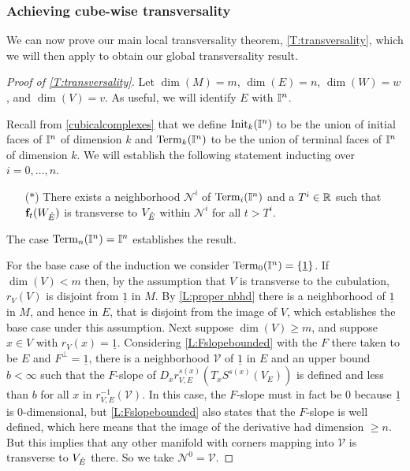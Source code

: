 

\subsubsection{Achieving cube-wise transversality}
We can now prove our main local transversality theorem, \cref{T:transversality}, which we will then apply to obtain our global transversality result.



\begin{proof}[Proof of \cref{T:transversality}]
	Let $\dim(M) = m$, $\dim(E) = n$, $\dim(W) = w$, and $\dim(V) = v$.
	As useful, we will identify $E$ with $\mathbb{I}^n$.

	Recall from \cref{cubicalcomplexes} that we define ${\rm Init}_k(\mathbb{I}^n)$ to be the union of initial faces of $\mathbb{I}^n$ of dimension $k$ and ${\rm Term}_k(\mathbb{I}^n)$ to be the union of terminal faces of $\mathbb{I}^n$ of dimension $k$.
	We will establish the following statement inducting over $i = 0, \dots, n$.
	\begin{itemize}
		\item[($\ast$)] There exists a neighborhood $\mathcal N^i$ of ${\rm Term}_{i}(\mathbb{I}^n)$ and a $T^i \in \mathbb{R}$ such that $\mathbf{f}_t(W_{\mathring{E}})$ is transverse to $V_{\mathring{E}}$ within $\mathcal N^i$ for all $t > T^i$.
	\end{itemize}
	The case $ {\rm Term}_{n}(\mathbb{I}^n) = \mathbb{I}^n$ establishes the result.

	For the base case of the induction we consider ${\rm Term}_0(\mathbb{I}^n) = \{\underline{1}\}$.
	If $\dim(V) < m$ then, by the assumption that $V$ is transverse to the cubulation, $r_V(V)$ is disjoint from $\underline{1}$ in $M$.
	By \cref{L:proper nbhd} there is a neighborhood of $\underline{1}$ in $M$, and hence in $E$, that is disjoint from the image of $V$, which establishes the base case under this assumption.
	Next suppose $\dim(V) \geq m$, and suppose $x \in V$ with $r_V(x) = \underline{1}$.
	Considering \cref{L:Fslopebounded} with the $F$ there taken to be $E$ and $F^\perp = \underline{1}$, there is a neighborhood $\mathcal{V}$ of $\underline{1}$ in $E$ and an upper bound $b < \infty$ such that the $F$-slope of $D_xr^{s(x)}_{V,E}(T_xS^{s(x)}(V_E))$ is defined and less than $b$ for all $x$ in $r_{V,E}^{-1}(\mathcal{V})$.
	In this case, the $F$-slope must in fact be $0$ because $\underline{1}$ is $0$-dimensional, but \cref{L:Fslopebounded} also states that the $F$-slope is well defined, which here means that the image of the derivative had dimension $\geq n$.
	But this implies that any other manifold with corners mapping into $\mathcal V$ is transverse to $V_{\mathring{E}}$ there.
	So we take $\mathcal N^0 = \mathcal V$.


\end{proof}
